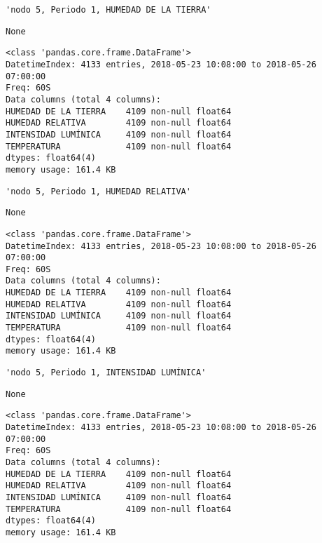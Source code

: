 \documentclass[11pt]{article}
\begin{document}
    
    \begin{verbatim}
'nodo 5, Periodo 1, HUMEDAD DE LA TIERRA'
    \end{verbatim}

    
    
    \begin{verbatim}
None
    \end{verbatim}

    
    \begin{Verbatim}[commandchars=\\\{\}]
<class 'pandas.core.frame.DataFrame'>
DatetimeIndex: 4133 entries, 2018-05-23 10:08:00 to 2018-05-26 07:00:00
Freq: 60S
Data columns (total 4 columns):
HUMEDAD DE LA TIERRA    4109 non-null float64
HUMEDAD RELATIVA        4109 non-null float64
INTENSIDAD LUMÍNICA     4109 non-null float64
TEMPERATURA             4109 non-null float64
dtypes: float64(4)
memory usage: 161.4 KB

    \end{Verbatim}

    
    \begin{verbatim}
'nodo 5, Periodo 1, HUMEDAD RELATIVA'
    \end{verbatim}

    
    
    \begin{verbatim}
None
    \end{verbatim}

    
    \begin{Verbatim}[commandchars=\\\{\}]
<class 'pandas.core.frame.DataFrame'>
DatetimeIndex: 4133 entries, 2018-05-23 10:08:00 to 2018-05-26 07:00:00
Freq: 60S
Data columns (total 4 columns):
HUMEDAD DE LA TIERRA    4109 non-null float64
HUMEDAD RELATIVA        4109 non-null float64
INTENSIDAD LUMÍNICA     4109 non-null float64
TEMPERATURA             4109 non-null float64
dtypes: float64(4)
memory usage: 161.4 KB

    \end{Verbatim}

    
    \begin{verbatim}
'nodo 5, Periodo 1, INTENSIDAD LUMÍNICA'
    \end{verbatim}

    
    
    \begin{verbatim}
None
    \end{verbatim}

    
    \begin{Verbatim}[commandchars=\\\{\}]
<class 'pandas.core.frame.DataFrame'>
DatetimeIndex: 4133 entries, 2018-05-23 10:08:00 to 2018-05-26 07:00:00
Freq: 60S
Data columns (total 4 columns):
HUMEDAD DE LA TIERRA    4109 non-null float64
HUMEDAD RELATIVA        4109 non-null float64
INTENSIDAD LUMÍNICA     4109 non-null float64
TEMPERATURA             4109 non-null float64
dtypes: float64(4)
memory usage: 161.4 KB

    \end{Verbatim}
\end{document}
